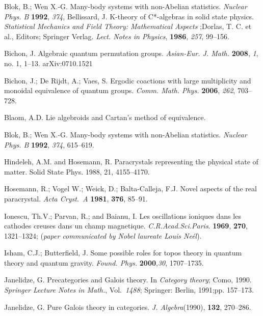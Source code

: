 \documentclass[12pt]{article}
\theoremstyle{plain}
\theoremstyle{definition}
\numberwithin{equation}{section}
\begin{document}
\begin{thebibliography}{99}
Blok, B.; Wen X.-G. Many-body systems with non-Abelian statistics. {\em Nuclear Phys. B} {\bf 1992}, {\em 374}, 
Bellissard, J.  K-theory of C*-algebras in solid state physics. \emph{Statistical Mechanics and Field Theory: Mathematical Aspects}
;Dorlas, T. C. et al., Editors; Springer Verlag. \emph{Lect. Notes in Physics}, {\bf 1986}, {\em 257}, 99--156.

Bichon, J.  Algebraic quantum permutation groups. {\em Asian-Eur. J. Math.} {\bf 2008}, {\em 1}, no. 1, 1--13. arXiv:0710.1521

Bichon, J.; De Rijdt, A.; Vaes, S.  Ergodic coactions with large multiplicity and monoidal equivalence of quantum groups. {\em Comm. Math. Phys.} {\bf 2006}, {\em 262}, 703--728. 

Blaom, A.D.  Lie algebroids and Cartan's method of equivalence. %

Blok, B.; Wen X.-G. Many-body systems with non-Abelian statistics. {\em Nuclear Phys. B} {\bf 1992}, {\em 374}, 615--619.

Hindeleh, A.M. and Hosemann, R. Paracrystals representing the physical state of matter. Solid State Phys.  1988,  21, 4155--4170.

Hosemann, R.; Vogel W.;  Weick, D.; Balta-Calleja, F.J.  Novel aspects of the real paracrystal.  \emph{Acta Cryst.~A} {\bf 1981}, {\bf 376}, 85--91.

Ionescu, Th.V.; Parvan, R.; and Baianu, I.  Les oscillations ioniques dans les cathodes creuses dans un champ magnetique. \emph{C.R.Acad.Sci.Paris}. {\bf 1969}, {\bf 270}, 1321--1324; (\emph{paper communicated by Nobel laureate Louis Ne\'el}).

Isham, C.J.; Butterfield, J.  Some possible roles for topos theory in quantum theory and quantum gravity. {\em Found. Phys.} {\bf 2000},{\em 30}, 1707--1735. %

Janelidze, G.  Precategories and Galois theory. In \emph{Category theory}; Como, 1990. {\em Springer Lecture Notes in Math.}, Vol.~\emph{1488}; Springer: Berlin, 1991;pp. 157--173.

Janelidze, G. Pure Galois theory in categories. \emph{J. Algebra}(1990), {\bf 132}, 270--286.


\end{thebibliography}
\end{document}
